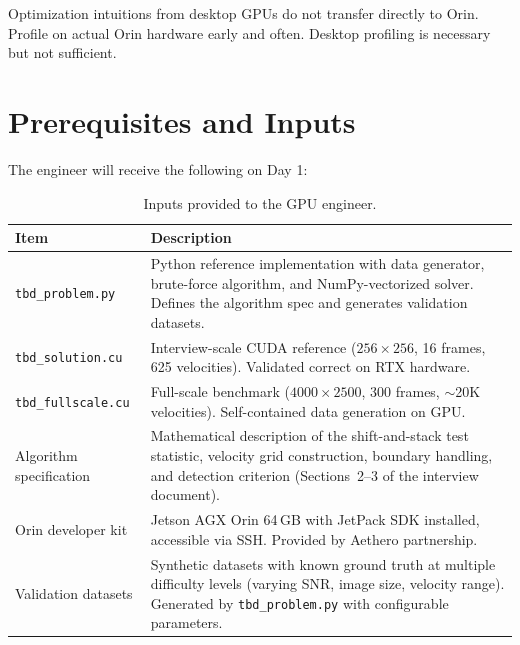\documentclass[11pt,letterpaper]{article}
\begin{document}
\begin{warnbox}
Optimization intuitions from desktop GPUs do not transfer directly to
Orin. Profile on actual Orin hardware early and often. Desktop profiling
is necessary but not sufficient.
\end{warnbox}

\section{Prerequisites and Inputs}
\label{sec:prerequisites}

The engineer will receive the following on Day 1:

\begin{table}[h]
\centering
\caption{Inputs provided to the GPU engineer.}
\begin{tabular}{@{}p{4.5cm}p{9cm}@{}}
\toprule
\textbf{Item} & \textbf{Description} \\
\midrule
\texttt{tbd\_problem.py} &
    Python reference implementation with data generator, brute-force
    algorithm, and NumPy-vectorized solver. Defines the algorithm spec
    and generates validation datasets. \\
\addlinespace
\texttt{tbd\_solution.cu} &
    Interview-scale CUDA reference ($256 \times 256$, 16 frames, 625
    velocities). Validated correct on RTX hardware. \\
\addlinespace
\texttt{tbd\_fullscale.cu} &
    Full-scale benchmark ($4000 \times 2500$, 300 frames, $\sim$20K
    velocities). Self-contained data generation on GPU. \\
\addlinespace
Algorithm specification &
    Mathematical description of the shift-and-stack test statistic,
    velocity grid construction, boundary handling, and detection
    criterion (Sections~2--3 of the interview document). \\
\addlinespace
Orin developer kit &
    Jetson AGX Orin 64\,GB with JetPack SDK installed, accessible via
    SSH. Provided by Aethero partnership. \\
\addlinespace
Validation datasets &
    Synthetic datasets with known ground truth at multiple difficulty
    levels (varying SNR, image size, velocity range). Generated by
    \texttt{tbd\_problem.py} with configurable parameters. \\
\bottomrule
\end{tabular}
\end{table}
\end{document}
